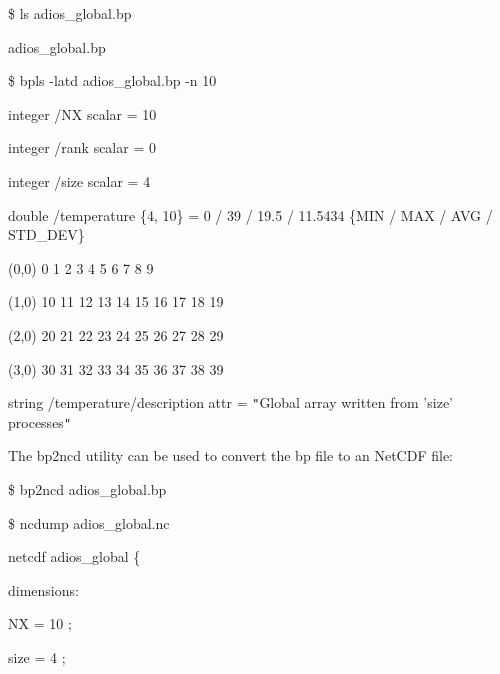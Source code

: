 \vspace{10pt}
\$ ls adios\_global.bp 

\vspace{10pt}
adios\_global.bp

\vspace{22pt}
\$  bpls -latd adios\_global.bp -n 10

\vspace{22pt}
integer    /NX                       scalar = 10

\vspace{10pt}
\parindent=3pt
integer    /rank                     scalar = 0

\vspace{10pt}
integer    /size                     scalar = 4

\vspace{10pt}
\parindent=7pt
double     /temperature              \{4, 10\} = 0 / 39 / 19.5 / 11.5434  \{MIN 
/ MAX / AVG / STD\_DEV\}

\vspace{10pt}
\parindent=14pt
(0,0)    0 1 2 3 4 5 6 7 8 9

\vspace{10pt}
(1,0)    10 11 12 13 14 15 16 17 18 19

\vspace{10pt}
\parindent=28pt
(2,0)    20 21 22 23 24 25 26 27 28 29

\vspace{10pt}
\parindent=14pt
(3,0)    30 31 32 33 34 35 36 37 38 39

\vspace{22pt}
\parindent=7pt
string     /temperature/description  attr   = \texttt{"}Global array written from 
'size' processes\texttt{"}

\vspace{10pt}
\parindent=0pt
The bp2ncd utility can be used to convert the bp file to an NetCDF file:

\vspace{22pt}
\$ bp2ncd adios\_global.bp

\vspace{10pt}
\$ ncdump adios\_global.nc 

\vspace{10pt}
netcdf adios\_global \{

\vspace{10pt}
dimensions:

\vspace{10pt}
\parindent=28pt
NX = 10 ;

\vspace{10pt}
size = 4 ;

